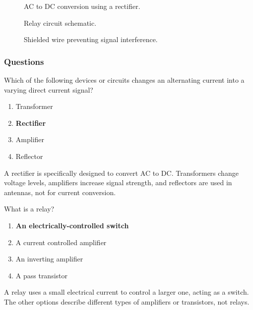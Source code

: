 \begin{figure}[h]
\centering
\caption{AC to DC conversion using a rectifier.}
\label{fig:rectifier}
\end{figure}

\begin{figure}[h]
\centering
\caption{Relay circuit schematic.}
\label{fig:relay}
\end{figure}

\begin{figure}[h]
\centering
\caption{Shielded wire preventing signal interference.}
\label{fig:shielded-wire}
\end{figure}

\subsubsection*{Questions}

\begin{tcolorbox}[colback=gray!10!white,colframe=black!75!black,title={T6D01}]
Which of the following devices or circuits changes an alternating current into a varying direct current signal?
\begin{enumerate}[label=\Alph*),noitemsep]
    \item Transformer
    \item \textbf{Rectifier}
    \item Amplifier
    \item Reflector
\end{enumerate}
\end{tcolorbox}
A rectifier is specifically designed to convert AC to DC. Transformers change voltage levels, amplifiers increase signal strength, and reflectors are used in antennas, not for current conversion.

\begin{tcolorbox}[colback=gray!10!white,colframe=black!75!black,title={T6D02}]
What is a relay?
\begin{enumerate}[label=\Alph*),noitemsep]
    \item \textbf{An electrically-controlled switch}
    \item A current controlled amplifier
    \item An inverting amplifier
    \item A pass transistor
\end{enumerate}
\end{tcolorbox}
A relay uses a small electrical current to control a larger one, acting as a switch. The other options describe different types of amplifiers or transistors, not relays.

